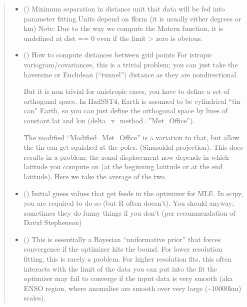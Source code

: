 \documentclass[letterpaper,10pt,english]{sphinxmanual}
\begin{document}
\begin{fulllineitems}
\begin{fulllineitems}
\begin{quote}
\begin{description}
\begin{itemize}
\item {}
\sphinxAtStartPar
{} () \textendash{} Minimum separation in distance unit that data
will be fed into parameter fitting
Units depend on fform (it is usually either degrees or km)
Note: Due to the way we compute the Matern function,
it is undefined at dist == 0 even if the limit \sphinxhyphen{}\textgreater{} zero is obvious.

\item {}
\sphinxAtStartPar
{} () \textendash{}
\sphinxAtStartPar
How to compute distances between grid points
For istropic variogram/covariances, this is a trivial problem;
you can just take the haversine or
Euclidean (“tunnel”) distance as they are non\sphinxhyphen{}directional.

\sphinxAtStartPar
But it is non trivial for anistropic cases,
you have to define a set of orthogonal space. In HadSST4,
Earth is assumed to be cylindrical “tin can” Earth,
so you can just define the orthogonal space by
lines of constant lat and lon (delta\_x\_method=”Met\_Office”).

\sphinxAtStartPar
The modified “Modified\_Met\_Office” is a variation to that,
but allow the tin can get squished at the poles.
(Sinusoidal projection). This does results in a problem:
the zonal displacement now depends in which latitude
you compute on (at the beginning latitude or at the end latitude).
Here we take the average of the two.


\item {}
\sphinxAtStartPar
{} () \textendash{} Initial guess values that get feeds in the optimizer for MLE.
In scipy, you are required to do so (but R often doesn’t).
You should anyway; sometimes they do funny things
if you don’t (per recommendation of David Stephenson)

\item {}
\sphinxAtStartPar
{} () \textendash{} This is essentially a Bayesian “uniformative prior”
that forces convergence if the optimizer hits the bound.
For lower resolution fitting, this is rarely a problem.
For higher resolution fits, this often interacts with
the limit of the data you can put into the fit the optimizer
may fail to converge if the input data is very smooth (aka ENSO
region, where anomalies are smooth over very large (\textasciitilde{}10000km)
scales).


\end{itemize}
\end{description}
\end{quote}
\end{fulllineitems}
\end{fulllineitems}
\end{document}
